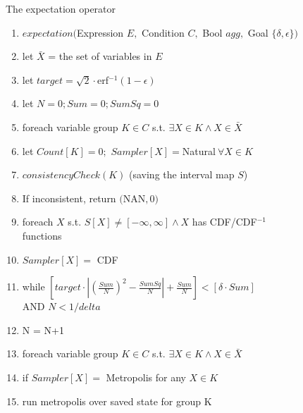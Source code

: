 \begin{figure}
\begin{algorithm} The expectation operator
\label{alg:roadmap}
\footnotesize
\begin{enumerate}
\item $expectation($Expression $E,$ Condition $C,$ Bool $agg,$ Goal $\{\delta, \epsilon\})$
\item \hspace*{0.1in} let $\bar X$ = the set of variables in $E$
\item \hspace*{0.1in} let $target = \sqrt{2}\cdot $erf$^{-1}(1-\epsilon)$
\item \hspace*{0.1in} let $N = 0; Sum = 0; SumSq = 0$
\item \hspace*{0.1in} foreach variable group $K \in C$ s.t. $\exists X \in K \wedge X \in \bar X$ 
\item \hspace*{0.2in} let $Count[K] = 0;$ $Sampler[X] = $Natural$\ \forall X \in K$
\item \hspace*{0.2in} $consistencyCheck(K)$ (saving the interval map $S$)
\item \hspace*{0.2in} If inconsistent, return $($NAN$,0)$
\item \hspace*{0.2in} foreach $X$ s.t. $S[X] \neq [-\infty, \infty] \wedge X$ has CDF/CDF$^{-1}$ functions
\item \hspace*{0.3in} $Sampler[X] =$ CDF
\item \hspace*{0.1in} while $\left[target \cdot \left|(\frac{Sum}{N})^2 - \frac{SumSq}{N}\right| + \frac{Sum}{N}\right] < \left[\delta \cdot Sum\right]$  \\\hspace*{0.4in} AND $N < 1/delta$
\item \hspace*{0.2in} N = N+1
\item \hspace*{0.2in} foreach variable group $K \in C$ s.t. $\exists X \in K \wedge X \in \bar X$
\item \hspace*{0.3in} if $Sampler[X] =$ Metropolis for any $X \in K$
\item \hspace*{0.4in} run metropolis over saved state for group K

\end{enumerate}
\end{algorithm}
\end{figure}
